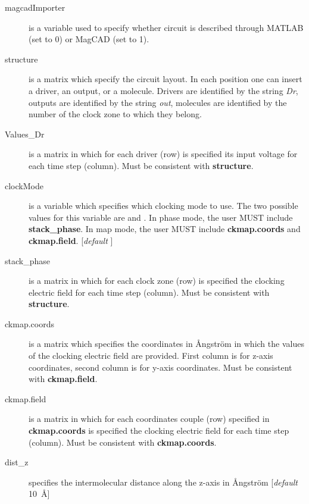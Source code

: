 \documentclass[a4paper,10pt]{article}
\begin{document}
\begin{description}
\item[magcadImporter \danger] is a variable used to specify whether circuit is described through MATLAB (set to 0) or MagCAD (set to 1).

\item[structure \danger] is a matrix which specify the circuit layout. In each position one can insert a driver, an output, or a molecule. Drivers are identified by the string \textit{Dr}, outputs are identified by the string \textit{out}, molecules are identified by the number of the clock zone to which they belong. 
  
\item[Values\_Dr \danger] is a matrix in which for each driver (row) is specified its input voltage for each time step (column). Must be consistent with \textbf{structure}. 

\item[clockMode] is a variable which specifies which clocking mode to use. The two possible values for this variable are \textcolor{mylilas}{\textquotesingle} and \textcolor{mylilas}{\textquotesingle}. In phase mode, the user MUST include \textbf{stack\_phase}. In map mode, the user MUST include \textbf{ckmap.coords} and \textbf{ckmap.field}. [\textit{default} \textquotesingle]

\item[stack\_phase \danger] is a matrix in which for each clock zone (row) is specified the clocking electric field for each time step (column). Must be consistent with \textbf{structure}. 

\item[ckmap.coords \danger] is a matrix which specifies the coordinates in \r{A}ngstr\"{o}m in which the values of the clocking electric field are provided. First column is for z-axis coordinates, second column is for y-axis coordinates. Must be consistent with \textbf{ckmap.field}. 

\item[ckmap.field \danger] is a matrix in which for each coordinates couple (row) specified in \textbf{ckmap.coords} is specified the clocking electric field for each time step (column). Must be consistent with \textbf{ckmap.coords}. 

\item[dist\_z] specifies the intermolecular distance along the z-axis in \r{A}ngstr\"{o}m [\textit{default} 10~\AA]


\end{description}
\end{document}
